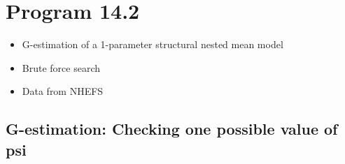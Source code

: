 \documentclass[
  10pt,
  a4paper,
]{book}
\providecommand{\tightlist}{%
  \setlength{\itemsep}{0pt}\setlength{\parskip}{0pt}}
\begin{document}
\section{Program 14.2}\label{program-14.2}

\begin{itemize}
\tightlist
\item
  G-estimation of a 1-parameter structural nested mean model
\item
  Brute force search
\item
  Data from NHEFS
\end{itemize}

\subsection{G-estimation: Checking one possible value of psi}\label{g-estimation-checking-one-possible-value-of-psi}
\end{document}
